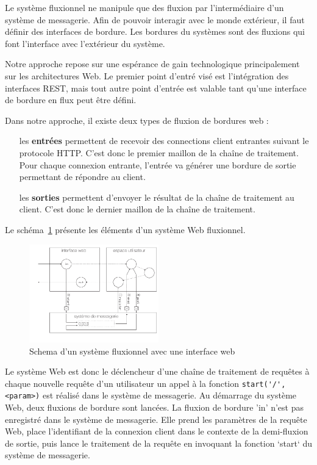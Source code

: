 Le système fluxionnel ne manipule que des fluxion par l'intermédiaire d'un système de messagerie.
Afin de pouvoir interagir avec le monde extérieur, il faut définir des interfaces de bordure.
Les bordures du systèmes sont des fluxions qui font l'interface avec l'extérieur du système.

Notre approche repose sur une espérance de gain technologique principalement sur les architectures Web.
Le premier point d'entré visé est l'intégration des interfaces REST, mais tout autre point d'entrée est valable tant qu'une interface de bordure en flux peut être défini.

Dans notre approche, il existe deux types de fluxion de bordures web :

\begin{itemize}
	\item[les \textbf{entrées}]
    permettent de recevoir des connections client entrantes suivant le protocole HTTP.
    C'est donc le premier maillon de la chaîne de traitement.
    Pour chaque connexion entrante, l'entrée va générer une bordure de sortie permettant de répondre au client.
	\item[les \textbf{sorties}]
    permettent d'envoyer le résultat de la chaîne de traitement au client.
    C'est donc le dernier maillon de la chaîne de traitement.
\end{itemize}


Le schéma~\ref{fig:schemaweb} présente les éléments d'un système Web fluxionnel.

\begin{figure}[h!]
	\includegraphics[width=0.5\textwidth]{schema-web.pdf}
	\caption{Schema d'un système fluxionnel avec une interface web}
	\label{fig:schemaweb}
\end{figure}

Le système Web est donc le déclencheur d'une chaîne de traitement de requêtes à chaque nouvelle requête d'un utilisateur un appel à la fonction \lstinline|start('/', <param>)| est réalisé dans le système de messagerie.
Au démarrage du système Web, deux fluxions de bordure sont lancées.
La fluxion de bordure 'in' n'est pas enregistré dans le système de messagerie.
Elle prend les paramètres de la requête Web, place l'identifiant de la connexion client dans le contexte de la demi-fluxion de sortie, puis lance le traitement de la requête en invoquant la fonction `start` du système de messagerie.

